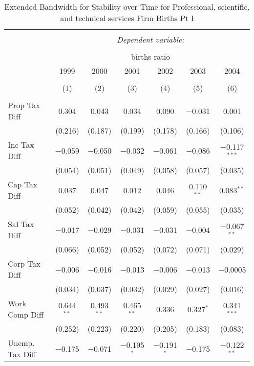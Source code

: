 
\begin{table}[!htbp] \centering 
  \caption{Extended Bandwidth for Stability over Time for  Professional, scientific, and technical services Firm Births Pt I} 
  \label{54year_eb} 
\small 
\begin{tabular}{@{\extracolsep{5pt}}lcccccc} 
\\[-1.8ex]\hline 
\hline \\[-1.8ex] 
 & \multicolumn{6}{c}{\textit{Dependent variable:}} \\ 
\cline{2-7} 
\\[-1.8ex] & \multicolumn{6}{c}{births ratio} \\ 
 & 1999 & 2000 & 2001 & 2002 & 2003 & 2004 \\ 
\\[-1.8ex] & (1) & (2) & (3) & (4) & (5) & (6)\\ 
\hline \\[-1.8ex] 
 Prop Tax Diff & 0.304 & 0.043 & 0.034 & 0.090 & $-$0.031 & 0.001 \\ 
  & (0.216) & (0.187) & (0.199) & (0.178) & (0.166) & (0.106) \\ 
  Inc Tax Diff & $-$0.059 & $-$0.050 & $-$0.032 & $-$0.061 & $-$0.086 & $-$0.117$^{***}$ \\ 
  & (0.054) & (0.051) & (0.049) & (0.058) & (0.057) & (0.035) \\ 
  Cap Tax Diff & 0.037 & 0.047 & 0.012 & 0.046 & 0.110$^{**}$ & 0.083$^{**}$ \\ 
  & (0.052) & (0.042) & (0.042) & (0.059) & (0.055) & (0.035) \\ 
  Sal Tax Diff & $-$0.017 & $-$0.029 & $-$0.031 & $-$0.031 & $-$0.004 & $-$0.067$^{**}$ \\ 
  & (0.066) & (0.052) & (0.052) & (0.072) & (0.071) & (0.029) \\ 
  Corp Tax Diff & $-$0.006 & $-$0.016 & $-$0.013 & $-$0.006 & $-$0.013 & $-$0.0005 \\ 
  & (0.034) & (0.037) & (0.032) & (0.029) & (0.027) & (0.016) \\ 
  Work Comp Diff & 0.644$^{**}$ & 0.493$^{**}$ & 0.465$^{**}$ & 0.336 & 0.327$^{*}$ & 0.341$^{***}$ \\ 
  & (0.252) & (0.223) & (0.220) & (0.205) & (0.183) & (0.083) \\ 
  Unemp. Tax Diff & $-$0.175 & $-$0.071 & $-$0.195$^{*}$ & $-$0.191$^{*}$ & $-$0.175 & $-$0.122$^{**}$ \\ 

\end{tabular}
\end{table}
